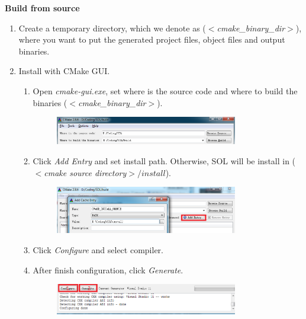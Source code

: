 \documentclass[11pt,a4paper]{article}
\newlength{\wideitemsep}
\let\olditem\item
\renewcommand{\item}{\setlength{\itemsep}{\wideitemsep}\olditem}
\begin{document}
\hspace{-5mm}\textbf{Build from source}
\begin{enumerate}
    \item Create a temporary directory, which we denote as
        ($<$\emph{cmake\_binary\_dir}$>$), where you want to put the generated
        project files, object files and output binaries.
    \item Install with CMake GUI.
        \begin{enumerate}
            \item Open \emph{cmake-gui.exe}, set where is the
                source code and where to build the binaries ($<$\emph{cmake\_binary\_dir}$>$).
                \begin{figure}[!h]
                    \centering
                    \includegraphics[width=0.8\textwidth]{figs/gui_path.png}
                    \label{fig:gui_path}
                \end{figure}
            \item Click \emph{Add Entry} and set install path. Otherwise, SOL will
                be install in ($<$\emph{cmake source directory}$>/install$).
                \begin{figure}[!h]
                    \centering
                    \includegraphics[width=0.8\textwidth]{figs/gui_install_path.png}
                    \label{fig:gui_install_path}
                \end{figure}

            \item Click \emph{Configure} and select compiler.
            \item After finish configuration, click \emph{Generate}.
                \begin{figure}[!h]
                    \centering
                    \includegraphics[width=0.8\textwidth]{figs/cmake_configure.png}
                    \label{fig:config}
                \end{figure}


\end{enumerate}
\end{enumerate}
\end{document}
